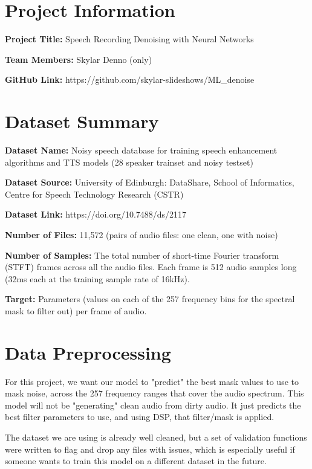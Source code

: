 \documentclass[11pt, letterpaper]{article}
\begin{document}
\section{Project Information}

\noindent \textbf{Project Title:} Speech Recording Denoising with Neural Networks

\noindent\textbf{Team Members:} Skylar Denno (only)

\noindent\textbf{GitHub Link:} https://github.com/skylar-slideshows/ML\_denoise


\section{Dataset Summary}



\noindent \textbf{Dataset Name:} Noisy speech database for training speech enhancement algorithms and TTS models (28 speaker trainset and noisy testset)

\noindent \textbf{Dataset Source:} University of Edinburgh: DataShare, School of Informatics, Centre for Speech Technology Research (CSTR)

\noindent \textbf{Dataset Link:} https://doi.org/10.7488/ds/2117 

\noindent \textbf{Number of Files:} 11,572 (pairs of audio files: one clean, one with noise)

\noindent \textbf{Number of Samples:} The total number of short-time Fourier transform (STFT) frames across all the audio files. Each frame is 512 audio samples long (32ms each at the training sample rate of 16kHz).

\noindent \textbf{Target:} Parameters (values on each of the 257 frequency bins for the spectral mask to filter out) per frame of audio.

\section{Data Preprocessing}
For this project, we want our model to "predict" the best mask values to use to mask noise, across the 257 frequency ranges that cover the audio spectrum. This model will not be "generating" clean audio from dirty audio. It just predicts the best filter parameters to use, and using DSP, that filter/mask is applied.

The dataset we are using is already well cleaned, but a set of validation functions were written to flag and drop any files with issues, which is especially useful if someone wants to train this model on a different dataset in the future.
\end{document}
